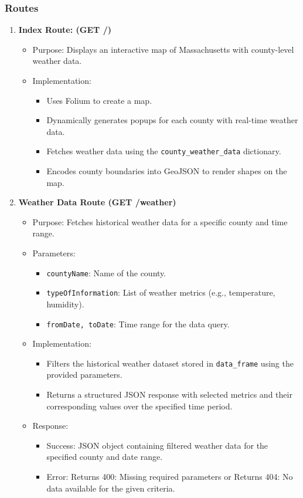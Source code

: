 \documentclass[a4paper, 12pt]{article}
\begin{document}
\subsubsection{Routes}
\begin{enumerate}
    \item \textbf{Index Route: (GET /)}
    \begin{itemize}
        \item Purpose: Displays an interactive map of Massachusetts with county-level weather data.
        \item Implementation:
        \begin{itemize}
            \item Uses Folium to create a map.
            \item Dynamically generates popups for each county with real-time weather data.
            \item Fetches weather data using the \texttt{county\_weather\_data} dictionary.
            \item Encodes county boundaries into GeoJSON to render shapes on the map.
        \end{itemize}
    \end{itemize}
    \item \textbf{Weather Data Route (GET /weather)}
    \begin{itemize}
        \item Purpose: Fetches historical weather data for a specific county and time range.
        \item Parameters:
        \begin{itemize}
            \item \texttt{countyName}: Name of the county.
            \item \texttt{typeOfInformation}: List of weather metrics (e.g., temperature, humidity).
            \item \texttt{fromDate, toDate}: Time range for the data query.
        \end{itemize}
        \item Implementation:
        \begin{itemize}
            \item Filters the historical weather dataset stored in \texttt{data\_frame} using the provided parameters.
            \item Returns a structured JSON response with selected metrics and their corresponding values over the specified time period.
        \end{itemize}
        \item Response:
        \begin{itemize}
            \item Success: JSON object containing filtered weather data for the specified county and date range.
            \item Error: Returns 400: Missing required parameters or Returns 404: No data available for the given criteria.
        \end{itemize}
    \end{itemize}
\end{enumerate}
\end{document}
